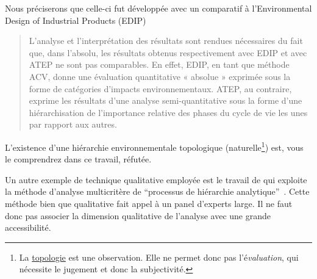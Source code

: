 Nous préciserons que celle-ci fut développée avec un comparatif à l'Environmental Design of Industrial Products (EDIP)
\blockcquote{le_pochat_ecodesign_2005}{
L’analyse et l’interprétation des résultats sont rendues nécessaires du fait que, dans l’absolu, les résultats obtenus respectivement avec EDIP et avec ATEP ne sont pas comparables.
En effet, EDIP, en tant que méthode ACV, donne une évaluation quantitative « absolue » exprimée sous la forme de catégories d’impacts environnementaux.
ATEP, au contraire, exprime les résultats d’une analyse semi-quantitative sous la forme d’une hiérarchisation de l’importance relative des phases du cycle de vie les unes par rapport aux autres.}
L’existence d'une hiérarchie environnementale topologique (naturelle\footnote{La \href{http://www.cnrtl.fr/definition/topologie}{topologie} est une observation. Elle ne permet donc pas l'é\emph{valuation}, qui nécessite le jugement et donc la subjectivité.}) est, vous le comprendrez dans ce travail, réfutée.

Un autre exemple de technique qualitative employée est le travail de \citeauthor{huang_multidimensional_2004} qui exploite la méthode d'analyse multicritère de ``processus de hiérarchie analytique''~\cite{huang_multidimensional_2004}.
Cette méthode bien que qualitative fait appel à un panel d'experts large.
Il ne faut donc pas associer la dimension qualitative de l'analyse avec une grande accessibilité.

